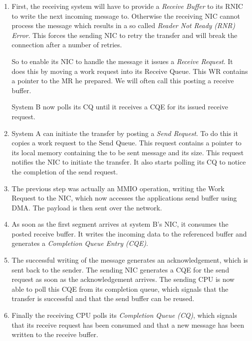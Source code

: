 \begin{enumerate}
  \item First, the receiving system will have to provide a \emph{Receive Buffer} to its RNIC to write the next incoming message to.
    Otherwise the receiving NIC cannot process the message which results in a so called \emph{Reader Not Ready (RNR) Error}.
    This forces the sending NIC to retry the transfer and will break the connection after a number of retries.

    So to enable its NIC to handle the message it issues a \emph{Receive Request}. It does this by moving a work request into its 
    Receive Queue. This WR contains a pointer to the MR he prepared. We will often call this posting a receive buffer. 

    System B now polls its CQ until it receives a CQE for its issued receive request.

  \item System A can initiate the transfer by posting a \emph{Send Request}. To do this it copies a work request to 
    the Send Queue. This request contains a pointer to its local memory containing the to be sent message
    and its size. This request notifies the NIC to initiate the transfer.
    It also starts polling its CQ to notice the completion of the send request.

  \item The previous step was actually an MMIO operation, writing the Work Request to the NIC, which now 
    accesses the applications send buffer using DMA. The payload is then sent over the network.

  \item As soon as the first segment arrives at system B's NIC, it consumes the posted receive buffer. It writes the incoming
    data to the referenced buffer and generates a \emph{Completion Queue Entry (CQE)}. 

  \item The successful writing of the message generates an acknowledgement, which is sent back to the sender. The sending NIC
    generates a CQE for the send request as soon as the acknowledgement arrives. The sending CPU is now able to poll this CQE
    from its completion queue, which signals that the transfer is successful and that the send buffer can be reused.

  \item Finally the receiving CPU polls its \emph{Completion Queue (CQ)}, which signals that its receive request has been 
    consumed and that a new message has been written to the receive buffer.
\end{enumerate}


